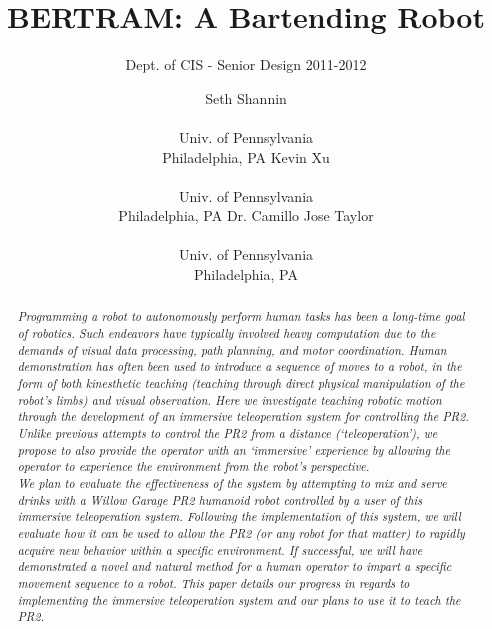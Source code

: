 \documentclass{sig-alternate}
\begin{document}
 

\title{BERTRAM: A Bartending Robot}

\subtitle{Dept. of CIS - Senior Design 2011-2012}
\author{
\alignauthor Seth Shannin \\  \\ Univ. of Pennsylvania \\ Philadelphia, PA
\alignauthor Kevin Xu \\  \\ Univ. of Pennsylvania \\ Philadelphia, PA
\alignauthor Dr. Camillo Jose Taylor \\  \\ Univ. of Pennsylvania \\ Philadelphia, PA}
\date{}
\maketitle

\begin{abstract}
\textit{\indent Programming a robot to autonomously perform human tasks has been a 
long-time goal of robotics. Such endeavors have typically involved heavy 
computation due to the demands of visual data processing, path planning, and motor 
coordination. Human demonstration has often been used to introduce a sequence 
of moves to a robot, in the form of both kinesthetic teaching (teaching through direct physical 
manipulation of the robot's limbs) and visual observation. Here we 
investigate teaching robotic motion through the development of an immersive
teleoperation system for controlling the PR2. Unlike previous attempts to
control the PR2 from a distance (`teleoperation'), we propose to also provide the
operator with an `immersive' experience by allowing the operator to experience 
the environment from the robot's perspective. \\
\indent We plan to evaluate the effectiveness of the system
by attempting to mix and serve drinks with a Willow Garage PR2 
humanoid robot controlled by a user of this immersive teleoperation system. Following the implementation of this system, we will evaluate how it can be used to allow
the PR2 (or any robot for that matter) to rapidly acquire new behavior within a specific environment. If successful, we will have demonstrated a novel and natural method for a
human operator to impart a specific movement sequence to a robot. This paper details our progress in regards to implementing the immersive teleoperation system and our plans to use it to teach the PR2.}
\end{abstract}
\end{document}
